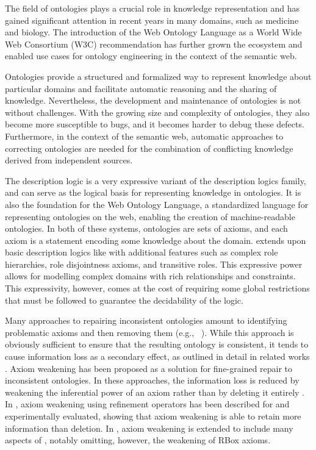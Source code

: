 
The field of ontologies plays a crucial role in knowledge representation and has gained significant attention in recent years in many domains, such as medicine and biology. The introduction of the Web Ontology Language as a World Wide Web Consortium (W3C) recommendation has further grown the ecosystem and enabled use cases for ontology engineering in the context of the semantic web.

Ontologies provide a structured and formalized way to represent knowledge about particular domains and facilitate automatic reasoning and the sharing of knowledge. Nevertheless, the development and maintenance of ontologies is not without challenges. With the growing size and complexity of ontologies, they also become more susceptible to bugs, and it becomes harder to debug these defects. Furthermore, in the context of the semantic web, automatic approaches to correcting ontologies are needed for the combination of conflicting knowledge derived from independent sources.

The \SROIQ description logic is a very expressive variant of the description logics family, and can serve as the logical basis for representing knowledge in ontologies. It is also the foundation for the Web Ontology Language, a standardized language for representing ontologies on the web, enabling the creation of machine-readable ontologies. In both of these systems, ontologies are sets of axioms, and each axiom is a statement encoding some knowledge about the domain. \SROIQ extends upon basic description logics like \ALC with additional features such as complex role hierarchies, role disjointness axioms, and transitive roles. This expressive power allows for modelling complex domains with rich relationships and constraints. This expressivity, however, comes at the cost of requiring some global restrictions that must be followed to guarantee the decidability of the logic.

Many approaches to repairing inconsistent ontologies amount to identifying problematic axioms and then removing them (e.g., ~\cite{schlobach2003non,kalyanpur2005debugging,kalyanpur2006repairing,BaPS07}). While this approach is obviously sufficient to ensure that the resulting ontology is consistent, it tends to cause information loss as a secondary effect, as outlined in detail in related works \cite{troquard2018repairing,confalonieri2020towards}. 
Axiom weakening has been proposed as a solution for fine-grained repair to inconsistent ontologies. In these approaches, the information loss is reduced by weakening the inferential power of an axiom rather than by deleting it entirely \cite{du2014practical,AMAI-2018,baader2018making,troquard2018repairing,confalonieri2020towards}. 
%
In \cite{troquard2018repairing}, axiom weakening using refinement operators has been described for \ALC and experimentally evaluated, showing that axiom weakening is able to retain more information than deletion. In \cite{confalonieri2020towards}, axiom weakening is extended to include many aspects of \SROIQ, notably omitting, however, the weakening of RBox axioms.

